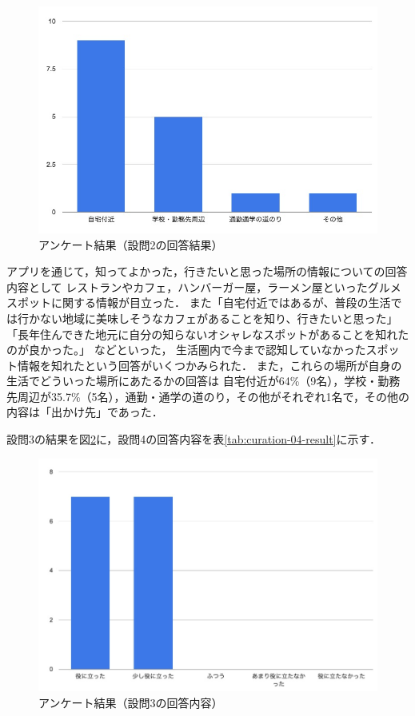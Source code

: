 \documentclass[a4paper]{jsarticle}
\begin{document}
\begin{enumerate}
\begin{enumerate}
\begin{enumerate}
  \fifigure
  \begin{figure}[H]
    \begin{center}
      \includegraphics[width=0.8\hsize]{./images/curation_02_result.jpg}
      \caption{アンケート結果（設問2の回答結果）}
      \label{fig:curation_02_result}
    \end{center}
  \end{figure}
  \fi

  アプリを通じて，知ってよかった，行きたいと思った場所の情報についての回答内容として
  レストランやカフェ，ハンバーガー屋，ラーメン屋といったグルメスポットに関する情報が目立った．
  また「自宅付近ではあるが、普段の生活では行かない地域に美味しそうなカフェがあることを知り、行きたいと思った」「長年住んできた地元に自分の知らないオシャレなスポットがあることを知れたのが良かった。」
  などといった，
  生活圏内で今まで認知していなかったスポット情報を知れたという回答がいくつかみられた．
  また，これらの場所が自身の生活でどういった場所にあたるかの回答は
  自宅付近が64\%（9名），学校・勤務先周辺が35.7\%（5名），通勤・通学の道のり，その他がそれぞれ1名で，その他の内容は「出かけ先」であった．

  設問3の結果を図\ref{fig:curation_03_result}に，設問4の回答内容を表\ref{tab:curation-04-result}に示す．

  \fifigure
  \begin{figure}[H]
    \begin{center}
      \includegraphics[width=0.8\hsize]{./images/curation_03_result.jpg}
      \caption{アンケート結果（設問3の回答内容）}
      \label{fig:curation_03_result}
    \end{center}
  \end{figure}
  \fi


\end{enumerate}
\end{enumerate}
\end{enumerate}
\end{document}
